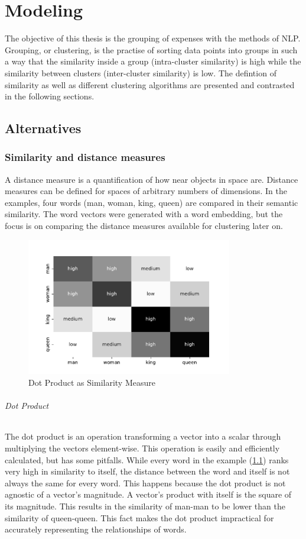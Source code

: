\chapter{Modeling}
The objective of this thesis is the grouping of expenses with the methods of \ac{NLP}. Grouping, or clustering, is the practise of sorting data points into groups in such a way that the similarity inside a group (intra-cluster similarity) is high while the similarity between clusters (inter-cluster similarity) is low. The defintion of similarity as well as different clustering algorithms are presented and contrasted in the following sections.


\section{Alternatives}
\subsection{Similarity and distance measures}
A distance measure is a quantification of how near objects in space are. Distance measures can be defined for spaces of arbitrary numbers of dimensions. In the examples, four words (man, woman, king, queen) are compared in their semantic similarity. The word vectors were generated with a word embedding, but the focus is on comparing the distance measures available for clustering later on.

		\begin{figure}[!h]
			\centering
			\includegraphics[height=6cm]{Bilder/models/heatmap_dot_product.pdf}
			\caption{Dot Product as Similarity Measure}
			\label{fig:dotproduct-heatmap}
		\end{figure}
	
		\subparagraph{Dot Product}
		The dot product is an operation transforming a vector into a scalar through multiplying the vectors element-wise. This operation is easily and efficiently calculated, but has some pitfalls.
		While every word in the example (\ref{fig:dotproduct-heatmap}) ranks very high in similarity to itself, the distance between the word and itself is not always the same for every word. This happens because the dot product is not agnostic of a vector's magnitude. A vector's product with itself is the square of its magnitude. This results in the similarity of man-man to be lower than the similarity of queen-queen.
		This fact makes the dot product impractical for accurately representing the relationships of words.
	

